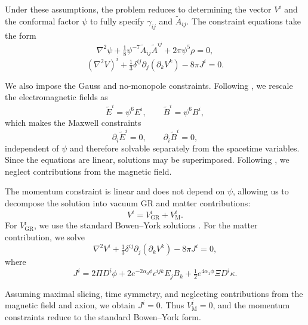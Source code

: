 Under these assumptions, the problem reduces to determining the vector $V^i$ and the conformal factor $\psi$ to fully specify $\gamma_{ij}$ and $\tilde{A}_{ij}$. The constraint equations take the form
\begin{equation}
    \nabla^2 \psi + \tfrac{1}{8} \psi^{-7} \tilde{A}_{ij} \tilde{A}^{ij} + 2\pi \psi^5 \rho = 0,
\end{equation}
\begin{equation}
    (\nabla^2 V)^i + \tfrac{1}{3}\delta^{ij}\partial_j(\partial_k V^k ) - 8 \pi J^i = 0. 
\end{equation}

We also impose the Gauss and no-monopole constraints. Following \cite{Alcubierre2009,Zilhao2012}, we rescale the electromagnetic fields as
\begin{equation}
    \tilde{E}^i = \psi^6 E^i, 
    \qquad
    \tilde{B}^i = \psi^6 B^i,
\end{equation}
which makes the Maxwell constraints
\begin{equation}
    \partial_i \tilde{E}^i = 0, 
    \qquad
    \partial_i \tilde{B}^i = 0,
\end{equation}
independent of $\psi$ and therefore solvable separately from the spacetime variables. Since the equations are linear, solutions may be superimposed. Following \cite{Bozzola2019}, we neglect contributions from the magnetic field.  

The momentum constraint is linear and does not depend on $\psi$, allowing us to decompose the solution into vacuum GR and matter contributions:
\begin{equation}
    V^i = V^i_{\text{GR}} + V^i_{\text{M}}.
\end{equation}
For $V^i_{\text{GR}}$, we use the standard Bowen--York solutions \cite{Bowen1980}. For the matter contribution, we solve
\begin{equation}
    \nabla^2 V^i + \tfrac{1}{3}\delta^{ij}\partial_j ( \partial_k V^k ) - 8 \pi J^i = 0,
\end{equation}
where
\begin{equation}
    J^i = 2 \Pi D^i \phi 
    + 2 e^{-2 \alpha_0 \phi} \epsilon^{ijk} E_j B_k 
    + \tfrac{1}{2}e^{4 \alpha_1 \phi} \Xi D^i \kappa.
\end{equation}

Assuming maximal slicing, time symmetry, and neglecting contributions from the magnetic field and axion, we obtain $J^i = 0$. Thus $V^i_{\text{M}}=0$, and the momentum constraints reduce to the standard Bowen--York form.  

